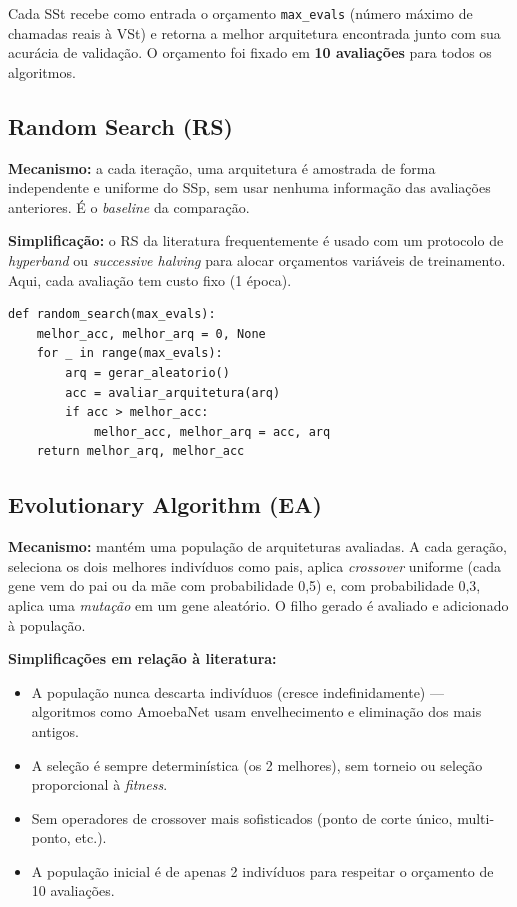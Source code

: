 \documentclass[a4paper,12pt]{article}
\begin{document}
Cada SSt recebe como entrada o orçamento \texttt{max\_evals} (número máximo de chamadas reais à VSt) e retorna a melhor arquitetura encontrada junto com sua acurácia de validação. O orçamento foi fixado em \textbf{10 avaliações} para todos os algoritmos.

\subsection{Random Search (RS)}

\textbf{Mecanismo:} a cada iteração, uma arquitetura é amostrada de forma independente e uniforme do SSp, sem usar nenhuma informação das avaliações anteriores. É o \textit{baseline} da comparação.

\textbf{Simplificação:} o RS da literatura frequentemente é usado com um protocolo de \textit{hyperband} ou \textit{successive halving} para alocar orçamentos variáveis de treinamento. Aqui, cada avaliação tem custo fixo (1 época).

\begin{lstlisting}[style=python, caption={Random Search.}]
def random_search(max_evals):
    melhor_acc, melhor_arq = 0, None
    for _ in range(max_evals):
        arq = gerar_aleatorio()
        acc = avaliar_arquitetura(arq)
        if acc > melhor_acc:
            melhor_acc, melhor_arq = acc, arq
    return melhor_arq, melhor_acc
\end{lstlisting}

\subsection{Evolutionary Algorithm (EA)}

\textbf{Mecanismo:} mantém uma população de arquiteturas avaliadas. A cada geração, seleciona os dois melhores indivíduos como pais, aplica \textit{crossover} uniforme (cada gene vem do pai ou da mãe com probabilidade 0,5) e, com probabilidade 0,3, aplica uma \textit{mutação} em um gene aleatório. O filho gerado é avaliado e adicionado à população.

\textbf{Simplificações em relação à literatura:}
\begin{itemize}[noitemsep]
    \item A população nunca descarta indivíduos (cresce indefinidamente) — algoritmos como AmoebaNet usam envelhecimento e eliminação dos mais antigos.
    \item A seleção é sempre determinística (os 2 melhores), sem torneio ou seleção proporcional à \textit{fitness}.
    \item Sem operadores de crossover mais sofisticados (ponto de corte único, multi-ponto, etc.).
    \item A população inicial é de apenas 2 indivíduos para respeitar o orçamento de 10 avaliações.
\end{itemize}
\end{document}
